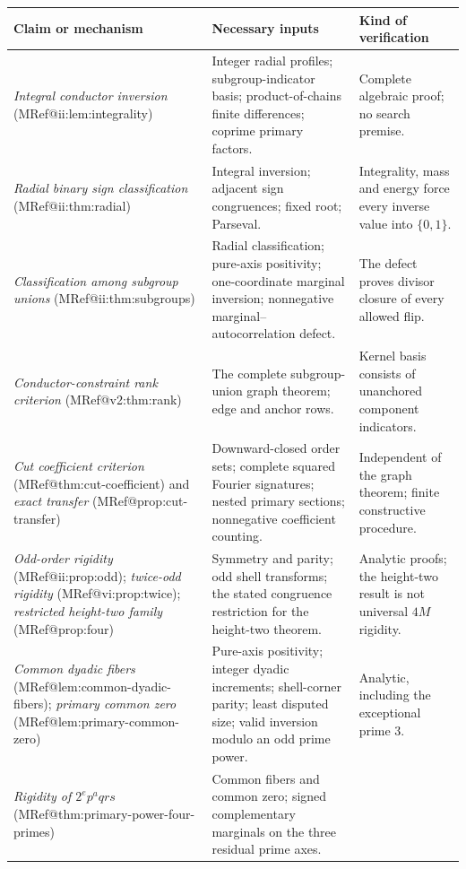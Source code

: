 \documentclass[10pt]{article}
\makeatletter
\newcommand{\mclaim}[2]{\textit{#2} (\csname MRef@#1\endcsname)}
\makeatother
\begin{document}
\small
\begin{longtable}{@{}>{\raggedright\arraybackslash}p{.29\linewidth}>{\raggedright\arraybackslash}p{.34\linewidth}>{\raggedright\arraybackslash}p{.29\linewidth}@{}}
\toprule
Claim or mechanism & Necessary inputs & Kind of verification\\\midrule
\endhead
\mclaim{ii:lem:integrality}{Integral conductor inversion}
& Integer radial profiles; subgroup-indicator basis; product-of-chains
finite differences; coprime primary factors.
& Complete algebraic proof; no search premise.\\[.5em]
\mclaim{ii:thm:radial}{Radial binary sign classification}
& Integral inversion; adjacent sign congruences; fixed root; Parseval.
& Integrality, mass and energy force every inverse value into $\{0,1\}$.\\[.5em]
\mclaim{ii:thm:subgroups}{Classification among subgroup unions}
& Radial classification; pure-axis positivity; one-coordinate marginal
inversion; nonnegative marginal--autocorrelation defect.
& The defect proves divisor closure of every allowed flip.\\[.5em]
\mclaim{v2:thm:rank}{Conductor-constraint rank criterion}
& The complete subgroup-union graph theorem; edge and anchor rows.
& Kernel basis consists of unanchored component indicators.\\[.5em]
\mclaim{thm:cut-coefficient}{Cut coefficient criterion} and
\mclaim{prop:cut-transfer}{exact transfer}
& Downward-closed order sets; complete squared Fourier signatures;
nested primary sections; nonnegative coefficient counting.
& Independent of the graph theorem; finite constructive procedure.\\[.5em]
\mclaim{ii:prop:odd}{Odd-order rigidity};
\mclaim{vi:prop:twice}{twice-odd rigidity};
\mclaim{prop:four}{restricted height-two family}
& Symmetry and parity; odd shell transforms; the stated congruence
restriction for the height-two theorem.
& Analytic proofs; the height-two result is not universal $4M$ rigidity.\\[.5em]
\mclaim{lem:common-dyadic-fibers}{Common dyadic fibers};
\mclaim{lem:primary-common-zero}{primary common zero}
& Pure-axis positivity; integer dyadic increments; shell-corner parity;
least disputed size; valid inversion modulo an odd prime power.
& Analytic, including the exceptional prime $3$.\\[.5em]
\mclaim{thm:primary-power-four-primes}{Rigidity of $2^ep^aqrs$}
& Common fibers and common zero; signed complementary marginals on the
three residual prime axes.

\end{longtable}
\end{document}
